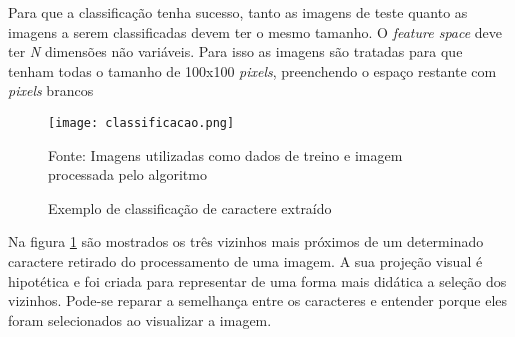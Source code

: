Para que a classificação tenha sucesso, tanto as imagens de teste quanto as imagens a serem classificadas devem ter o mesmo tamanho. O \emph{feature space} deve ter \emph{N} dimensões não variáveis. Para isso as imagens são tratadas para que tenham todas o tamanho de 100x100 \emph{pixels}, preenchendo o espaço restante com \emph{pixels} brancos

\begin{figure}[H]
	\centering
	\texttt{[image: classificacao.png]}
	\caption{Exemplo de classificação de caractere extraído}
Fonte: Imagens utilizadas como dados de treino e imagem processada pelo algoritmo
	\label{fig:classificacao}
\end{figure}

Na figura \ref{fig:classificacao} são mostrados os três vizinhos mais próximos de um determinado caractere retirado do processamento de uma imagem. A sua projeção visual é hipotética e foi criada para representar de uma forma mais didática a seleção dos vizinhos. Pode-se reparar a semelhança entre os caracteres e entender porque eles foram selecionados ao visualizar a imagem.